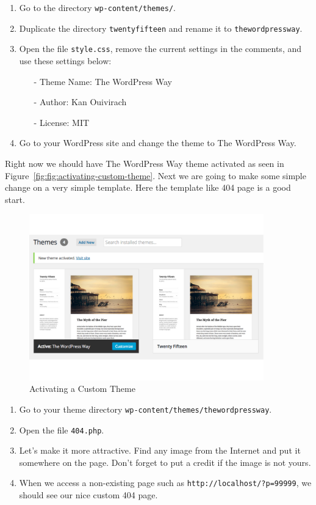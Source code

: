 \documentclass{article}
\begin{document}
\begin{enumerate}
    \item Go to the directory {\tt wp-content/themes/}.
    \item Duplicate the directory {\tt twentyfifteen} and rename it
        to {\tt thewordpressway}.
    \item Open the file {\tt style.css}, remove the current settings in the
        comments, and use these settings below:
        \begin{itemize}
            \item[-] Theme Name: The WordPress Way
            \item[-] Author: Kan Ouivirach
            \item[-] License: MIT
        \end{itemize}
    \item Go to your WordPress site and change the theme to The WordPress Way.
\end{enumerate}

\noindent Right now we should have The WordPress Way theme activated as seen in
Figure~\ref{fig:fig:activating-custom-theme}. Next we are going to make some
simple change on a very simple template. Here the template like 404 page is a
good start.

\FloatBarrier

\begin{figure}[t]
    \centering
    \includegraphics[width=4in]{figures/activating-custom-theme}
    \caption{Activating a Custom Theme}
    \label{fig:activating-custom-theme}
\end{figure}

\begin{enumerate}
    \item Go to your theme directory {\tt wp-content/themes/thewordpressway}.
    \item Open the file {\tt 404.php}.
    \item Let's make it more attractive. Find any image from the Internet and
        put it somewhere on the page. Don't forget to put a credit if the
        image is not yours.
    \item When we access a non-existing page such as
        {\tt http://localhost/?p=99999}, we should see our nice custom
        404 page.
\end{enumerate}
\end{document}
